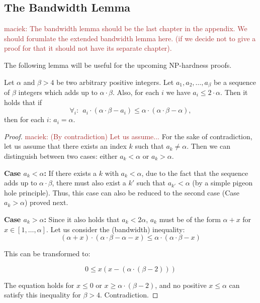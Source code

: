 \documentclass[9pt]{sigcomm-alternate}
\newcommand{\maciek}[1]{\textcolor{brown}{maciek: #1}}
\newcommand{\clauses}{\alpha}
\newcommand{\variables}{\beta}
\begin{document}
\begin{appendix}

\section{The Bandwidth Lemma}

\maciek{The bandwidth lemma should be the last chapter in the appendix. We should forumlate the extended bandwidth lemma here. (if we decide not to give a proof for that it should not have its separate chapter).}

The following lemma will be useful for the upcoming NP-hardness proofs.

\begin{lemma}\label{lem:bandwidth-lemma}
  Let $\clauses$ and $\variables > 4$ be two arbitrary positive integers. Let $a_1, a_2, \ldots,
  a_{\variables}$ be a sequence of $\variables$ integers which adds up to $\clauses \cdot \variables$. Also, for
  each $i$ we have $a_i \leq 2 \cdot \clauses$. Then it holds that if
  $$ \forall_i:~~ a_i \cdot (\clauses \cdot \variables - a_i) \leq \clauses \cdot (\clauses \cdot \variables -
  \clauses), $$
\noindent  then for each $i$: $a_i = \clauses$.
\end{lemma}
\begin{proof}
  \maciek{(By contradiction) Let us assume...}
For the sake of contradiction, let us assume that there exists an index $k$ such that
$a_k \neq \clauses$. Then we can distinguish between two cases:
either $a_k<\clauses$ or
$a_k>\clauses$.

\textbf{Case $a_k<\clauses$:} If there exists a $k$ with $a_k<\clauses$,
due to the fact that the sequence adds up to $\clauses \cdot \variables$,
there must also exist a $k'$ such that $a_{k'}<\clauses$ (by a simple
pigeon hole principle). Thus, this case can
also be reduced to the second case (Case $a_k>\clauses$) proved
next.

\textbf{Case $a_k>\clauses$:} Since it also holds that $a_k < 2\clauses$,
$a_k$ must be of the form $\clauses + x$ for $x \in [1, \ldots, \clauses]$.
Let us consider the (bandwidth) inequality:
$$ (\clauses + x) \cdot (\clauses \cdot \variables - \clauses - x) \leq \clauses \cdot (\clauses \cdot \variables - x) $$

This can be transformed to:

$$ 0 \leq x(x - (\clauses \cdot (\variables - 2))) $$

The equation holds for $x \leq 0$ or $x \geq \clauses \cdot (\variables - 2)$,
and no
positive $x \leq \clauses$ can satisfy this inequality for $\variables > 4$. Contradiction.
\end{proof}



\end{appendix}
\end{document}
